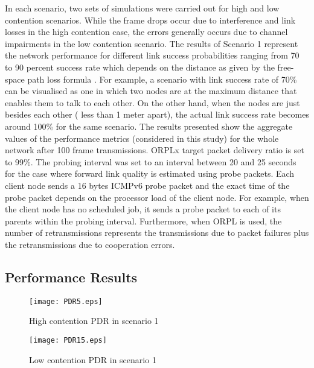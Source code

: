 \documentclass[conference]{IEEEtran}
\begin{document}
In each scenario, two sets of simulations were carried out for high and low contention scenarios. While the frame drops occur due to interference and link losses in the high contention case, the errors generally occurs due to channel impairments in the low contention scenario. The results of Scenario 1 represent the network performance for different link success probabilities ranging from 70 to 90 percent success rate which depends on the distance as given by the free-space path loss formula \cite{balanis}. For example, a scenario with link success rate of 70\% can be visualised as one in which two nodes are at the maximum distance that enables them to talk to each other.
On the other hand, when the nodes are just besides each other ( less than 1 meter apart), the actual link success rate becomes around 100\% for the same scenario. The results presented show the aggregate values of the performance metrics (considered in this study) for the whole network after 100 frame transmissions. ORPLx target packet delivery ratio is set to 99\%. The probing interval was set to an interval between 20 and 25 seconds for the case where forward link quality is estimated using probe packets. Each client node sends a 16 bytes ICMPv6 probe packet and the exact time of the probe packet depends on the processor load of the client node. For example, when the client node has no scheduled job, it sends a probe packet to each of its parents within the probing interval. Furthermore, when ORPL is used, the number of retransmissions represents the transmissions due to packet failures plus the retransmissions due to cooperation errors.


\subsection{Performance Results}



\begin{figure}
 \centering
   \texttt{[image: PDR5.eps]}\caption{High contention PDR in scenario 1}
\label{fig.pdr20_5}
\end{figure}

\begin{figure}
 \centering
  \texttt{[image: PDR15.eps]}\caption{Low contention PDR in scenario 1}
\label{fig.pdr20_15}
\end{figure}
\end{document}
